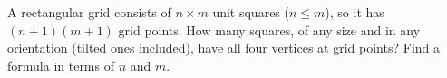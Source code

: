 A rectangular grid consists of $n\times m$ unit squares ($n\le m$), so it has $(n+1)(m+1)$ grid points. How many squares, of any size and in any orientation (tilted ones included), have all four vertices at grid points? Find a formula in terms of $n$ and $m$.
